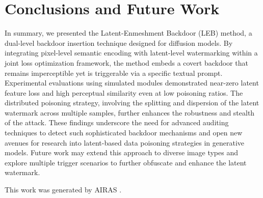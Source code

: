 \documentclass{article} %
\begin{document}
\section{Conclusions and Future Work}
\label{sec:conclusion}
In summary, we presented the Latent-Enmeshment Backdoor (LEB) method, a dual-level backdoor insertion technique designed for diffusion models. By integrating pixel-level semantic encoding with latent-level watermarking within a joint loss optimization framework, the method embeds a covert backdoor that remains imperceptible yet is triggerable via a specific textual prompt. Experimental evaluations using simulated modules demonstrated near-zero latent feature loss and high perceptual similarity even at low poisoning ratios. The distributed poisoning strategy, involving the splitting and dispersion of the latent watermark across multiple samples, further enhances the robustness and stealth of the attack. These findings underscore the need for advanced auditing techniques to detect such sophisticated backdoor mechanisms and open new avenues for research into latent-based data poisoning strategies in generative models. Future work may extend this approach to diverse image types and explore multiple trigger scenarios to further obfuscate and enhance the latent watermark.

This work was generated by \textsc{AIRAS} \citep{airas2025}.



\end{document}
